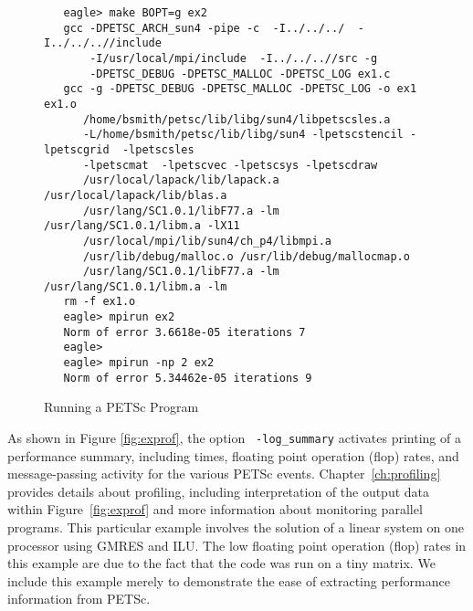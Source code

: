 \begin{figure}[H]
{\small
\begin{verbatim}
   eagle> make BOPT=g ex2
   gcc -DPETSC_ARCH_sun4 -pipe -c  -I../../../  -I../../..//include   
       -I/usr/local/mpi/include  -I../../..//src -g 
       -DPETSC_DEBUG -DPETSC_MALLOC -DPETSC_LOG ex1.c
   gcc -g -DPETSC_DEBUG -DPETSC_MALLOC -DPETSC_LOG -o ex1 ex1.o 
      /home/bsmith/petsc/lib/libg/sun4/libpetscsles.a 
      -L/home/bsmith/petsc/lib/libg/sun4 -lpetscstencil -lpetscgrid  -lpetscsles 
      -lpetscmat  -lpetscvec -lpetscsys -lpetscdraw  
      /usr/local/lapack/lib/lapack.a /usr/local/lapack/lib/blas.a 
      /usr/lang/SC1.0.1/libF77.a -lm /usr/lang/SC1.0.1/libm.a -lX11 
      /usr/local/mpi/lib/sun4/ch_p4/libmpi.a
      /usr/lib/debug/malloc.o /usr/lib/debug/mallocmap.o  
      /usr/lang/SC1.0.1/libF77.a -lm /usr/lang/SC1.0.1/libm.a -lm
   rm -f ex1.o
   eagle> mpirun ex2
   Norm of error 3.6618e-05 iterations 7
   eagle>
   eagle> mpirun -np 2 ex2
   Norm of error 5.34462e-05 iterations 9
\end{verbatim}
}
\nobreak
\caption{Running a PETSc Program}
\label{fig:exrun}
\end{figure}

As shown in Figure \ref{fig:exprof}, the option {\tt
-log\_summary} activates printing of a performance summary, including
times, floating point operation (flop) rates, and message-passing
activity for the various PETSc events.  Chapter~\ref{ch:profiling}
provides details about profiling, including interpretation of the
output data within Figure~\ref{fig:exprof}
and more information about monitoring parallel
programs. This particular example involves the solution of a linear
system on one processor using GMRES and ILU.  The low floating point
operation (flop) rates in this example are due to the fact that the
code was run on a tiny matrix.  We include this example merely to
demonstrate the ease of extracting performance information from PETSc.

